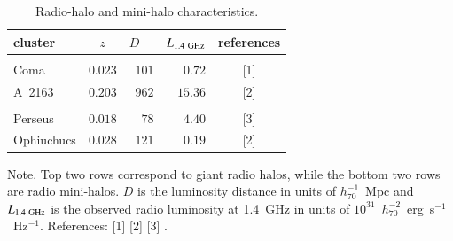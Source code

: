 \documentclass[useAMS,usenatbib]{mn2e}
\begin{document}
\begin{table} 
\begin{center}
\caption{Radio-halo and mini-halo characteristics.}
\medskip
\begin{tabular}{lcrrc}
\hline
\phantom{\Big|}
 cluster & $z$ & $D$~~ & $L_{1.4~{\mathrm{GHz}}}$ & references \\
\hline \\[-0.5em]
Coma           & $0.023$ & $101$ & $0.72$  &  [1]   \\
A~2163         & $0.203$ & $962$ & $15.36$  &  [2]  \\
\hline \\[-0.5em]
Perseus        & $0.018$ & $78$   & $4.40$ &  [3]  \\
Ophiuchucs     & $0.028$ & $121$  & $0.19$  &  [2] \\[0.5em]
\hline
\end{tabular}
\label{tab:RadioHalos}
\end{center}
\footnotesize{Note. Top two rows correspond to giant radio halos, while the
  bottom two rows are radio mini-halos.  $D$ is the luminosity distance in units
  of $h_{70}^{-1}$~Mpc and $L_{1.4~{\mathrm{GHz}}}$ is the observed radio luminosity
  at 1.4~GHz in units of $10^{31}$~$h_{70}^{-2}$~erg~s$^{-1}$~Hz$^{-1}$.
  References: [1] \cite{1997A&A...321...55D} [2] \cite{2009A&A...499..679M} [3]
  \cite{1990MNRAS.246..477P}.}
\end{table}
\end{document}
